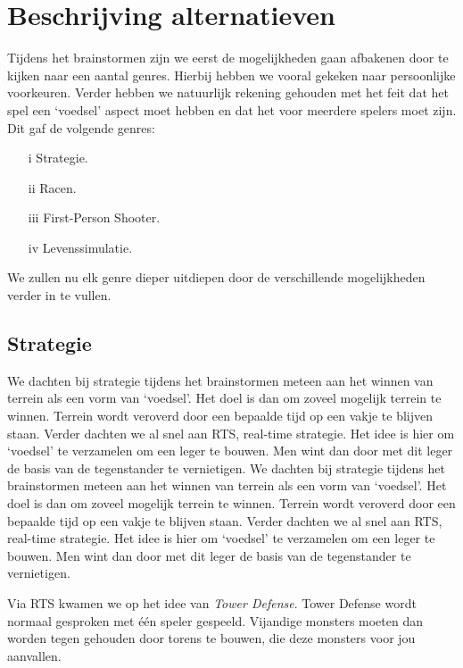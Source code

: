 \section{Beschrijving alternatieven}
Tijdens het brainstormen zijn we eerst de mogelijkheden gaan afbakenen door te kijken naar een aantal genres. Hierbij hebben we vooral gekeken naar persoonlijke voorkeuren. Verder hebben we natuurlijk rekening gehouden met het feit dat het spel een `voedsel' aspect moet hebben en dat het voor meerdere spelers moet zijn. Dit gaf de volgende genres:
\begin{enumerate}
\item[i] Strategie.
\item[ii] Racen.
\item[iii] First-Person Shooter.
\item[iv] Levenssimulatie.
\end{enumerate}
We zullen nu elk genre dieper uitdiepen door de verschillende mogelijkheden verder in te vullen.

\subsection{Strategie}
We dachten bij strategie tijdens het brainstormen meteen aan het winnen van terrein als een vorm van `voedsel'. Het doel is dan om zoveel mogelijk terrein te winnen. Terrein wordt veroverd door een bepaalde tijd op een vakje te blijven staan. Verder dachten we al snel aan RTS, real-time strategie. Het idee is hier om `voedsel' te verzamelen om een leger te bouwen. Men wint dan door met dit leger de basis van de tegenstander te vernietigen. 
We dachten bij strategie tijdens het brainstormen meteen aan het winnen van terrein als een vorm van `voedsel'. Het doel is dan om zoveel mogelijk terrein te winnen. Terrein wordt veroverd door een bepaalde tijd op een vakje te blijven staan. Verder dachten we al snel aan RTS, real-time strategie. Het idee is hier om `voedsel' te verzamelen om een leger te bouwen. Men wint dan door met dit leger de basis van de tegenstander te vernietigen.

Via RTS kwamen we op het idee van \emph{Tower Defense}. Tower Defense wordt normaal gesproken met \'e\'en speler gespeeld. Vijandige monsters moeten dan worden tegen gehouden door torens te bouwen, die deze monsters voor jou aanvallen.

